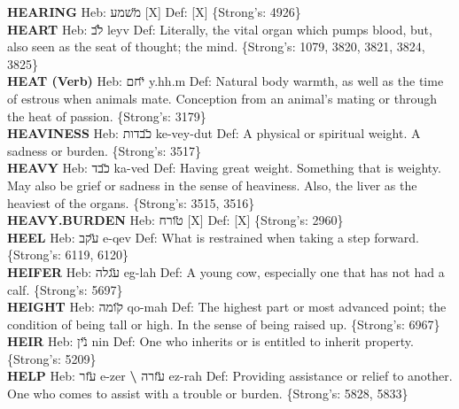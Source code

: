 {\textbf{HEARING} Heb: {\large\H משמע} {[}X{]} Def: {[}X{]} \{Strong's: 4926\}\hfill{}\\

\textbf{HEART} Heb: {\large\H לב} leyv Def: Literally, the vital organ which pumps blood, but, also seen as the seat of thought; the mind. \{Strong's: 1079, 3820, 3821, 3824, 3825\}\hfill{}\\

\textbf{HEAT (Verb)} Heb: {\large\H יחם} y.hh.m Def: Natural body warmth, as well as the time of estrous when animals mate. Conception from an animal’s mating or through the heat of passion. \{Strong's: 3179\}\hfill{}\\

\textbf{HEAVINESS} Heb: {\large\H כבדות} ke-vey-dut Def: A physical or spiritual weight. A sadness or burden. \{Strong's: 3517\}\hfill{}\\

\textbf{HEAVY} Heb: {\large\H כבד} ka-ved Def: Having great weight. Something that is weighty. May also be grief or sadness in the sense of heaviness. Also, the liver as the heaviest of the organs. \{Strong's: 3515, 3516\}\hfill{}\\

\textbf{HEAVY.BURDEN} Heb: {\large\H טורח} {[}X{]} Def: {[}X{]} \{Strong's: 2960\}\hfill{}\\

\textbf{HEEL} Heb: {\large\H עקב} e-qev Def: What is restrained when taking a step forward. \{Strong's: 6119, 6120\}\hfill{}\\

\textbf{HEIFER} Heb: {\large\H עגלה} eg-lah Def: A young cow, especially one that has not had a calf. \{Strong's: 5697\}\hfill{}\\

\textbf{HEIGHT} Heb: {\large\H קומה} qo-mah Def: The highest part or most advanced point; the condition of being tall or high. In the sense of being raised up. \{Strong's: 6967\}\hfill{}\\

\textbf{HEIR} Heb: {\large\H נין} nin Def: One who inherits or is entitled to inherit property. \{Strong's: 5209\}\hfill{}\\

\textbf{HELP} Heb: {\large\H עזר} e-zer \textbf{\textbackslash{}} {\large\H עזרה} ez-rah Def: Providing assistance or relief to another. One who comes to assist with a trouble or burden. \{Strong's: 5828, 5833\}\hfill{}\\

}
